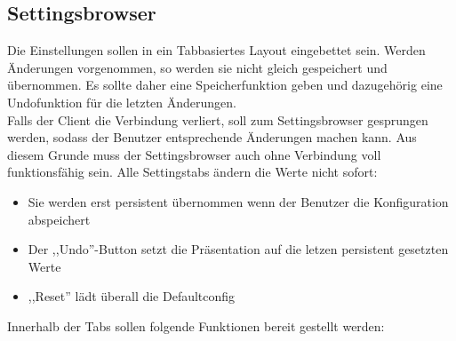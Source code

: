 
\subsection{Settingsbrowser}
Die Einstellungen sollen in ein Tabbasiertes Layout eingebettet sein. 
Werden Änderungen vorgenommen, so werden sie nicht gleich gespeichert und übernommen. 
Es sollte daher eine Speicherfunktion geben und dazugehörig eine Undofunktion für die letzten Änderungen.
\\
Falls der Client die Verbindung verliert, soll zum Settingsbrowser gesprungen werden, sodass der Benutzer entsprechende
Änderungen machen kann. Aus diesem Grunde muss der Settingsbrowser auch ohne Verbindung voll funktionsfähig sein.
Alle Settingstabs ändern die Werte nicht sofort:
\begin{itemize} 
    \item Sie werden erst persistent übernommen wenn der Benutzer die Konfiguration abspeichert
    \item Der ,,Undo''-Button setzt die Präsentation auf die letzen persistent gesetzten Werte
    \item ,,Reset'' lädt überall die Defaultconfig
\end{itemize}
Innerhalb der Tabs sollen folgende Funktionen bereit gestellt werden:
